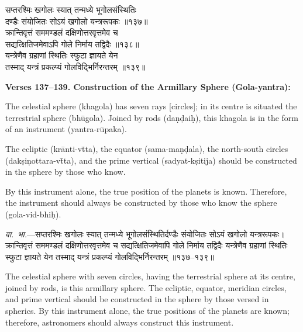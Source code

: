 \documentclass[11pt,a4paper]{article}
\begin{document}
\begin{minipage}[t]{0.48\textwidth}
\small\devanagarifont
सप्तरश्मिः खगोलः स्यात् तन्मध्ये भूगोलसंस्थितिः\\
दण्डैः संयोजितः सोऽयं खगोलो यन्त्ररूपकः ॥१३७॥\\[0.5em]
क्रान्तिवृत्तं सममण्डलं दक्षिणोत्तरवृत्तमेव च\\
सद्यत्क्षितिजमेवाऽपि गोले निर्माय तद्विदैः ॥१३८॥\\[0.5em]
यन्त्रेणैव ग्रहाणां स्थितिः स्फुटा ज्ञायते येन\\
तस्माद् यन्त्रं प्रकल्प्यं गोलविद्भिर्निरन्तरम् ॥१३९॥
\end{minipage}%
\hfill
\begin{minipage}[t]{0.48\textwidth}
\small
\textbf{Verses 137--139. Construction of the Armillary Sphere (Gola-yantra):}

The celestial sphere (khagola) has seven rays [circles]; in its centre is situated the terrestrial sphere (bh\=ugola). Joined by rods (da\d{n}\d{d}ai\d{h}), this khagola is in the form of an instrument (yantra-r\=upaka).

The ecliptic (kr\=anti-v\=tta), the equator (sama-ma\d{n}\d{d}ala), the north-south circles (dak\d{s}i\d{n}ottara-v\=tta), and the prime vertical (sadyat-k\d{s}itija) should be constructed in the sphere by those who know.

By this instrument alone, the true position of the planets is known. Therefore, the instrument should always be constructed by those who know the sphere (gola-vid-bhi\d{h}).
\end{minipage}

\vspace{0.5em}
\begin{minipage}[t]{0.48\textwidth}
\small\devanagarifont
\textit{वा.~भा.}---सप्तरश्मिः खगोलः स्यात् तन्मध्ये भूगोलसंस्थितिर्दण्डैः संयोजितः सोऽयं खगोलो यन्त्ररूपकः। क्रान्तिवृत्तं सममण्डलं दक्षिणोत्तरवृत्तमेव च सद्यत्क्षितिजमेवापि गोले निर्माय तद्विदैः यन्त्रेणैव ग्रहाणां स्थितिः स्फुटा ज्ञायते येन तस्माद् यन्त्रं प्रकल्प्यं गोलविद्भिर्निरन्तरम् ॥१३७--१३९॥
\end{minipage}%
\hfill
\begin{minipage}[t]{0.48\textwidth}
\small
The celestial sphere with seven circles, having the terrestrial sphere at its centre, joined by rods, is this armillary sphere. The ecliptic, equator, meridian circles, and prime vertical should be constructed in the sphere by those versed in spherics. By this instrument alone, the true positions of the planets are known; therefore, astronomers should always construct this instrument.
\end{minipage}
\end{document}
